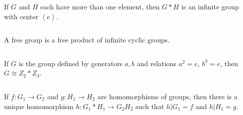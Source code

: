 $$ $$

\begin{ex}
    If $G$ and $H$ each have more than one element, then $G*H$ is an infinite group with center $\left\langle e\right\rangle$.
\end{ex}

$$ $$

\begin{ex}
    A free group is a free product of infinite cyclic groups.
\end{ex}

$$ $$

\begin{ex}
    If $G$ is the group defined by generators $a, b$ and relations $a^{2}=e$, $b^{3}=e$, then $G\cong Z_{2}*Z_{3}$.
\end{ex}

$$ $$

\begin{ex}
    If $f:G_{1}\to G_{2}$ and $g:H_{1}\to H_{2}$ are homomorphisms of groups, then there is a unique homomorphism $h:G_{1}*H_{1}\to G_{2}H_{2}$ such that $h|G_{1}=f$ and $h|H_{1}=g$.
\end{ex}